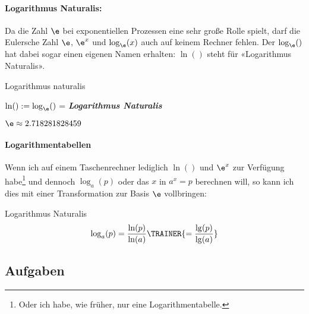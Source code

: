 \paragraph{Logarithmus Naturalis:} Da die
Zahl $\e$ bei exponentiellen Prozessen eine sehr große Rolle spielt,
darf die Eulersche Zahl $\e$, $\e^x$ und $\log_{\e}(x)$ auch auf keinem Rechner fehlen. Der $\log_{\e}()$ hat dabei sogar einen eigenen Namen erhalten:
$\ln()$ steht für «Logarithmus Naturalis».

\begin{definition}{Logarithmus naturalis}{}
  
  $\ln() := \log_{\e}()$ = \textit{\textbf{Logarithmus Naturalis}}

  $\e\approx 2.718281828459$
\end{definition}

\paragraph{Logarithmentabellen}
Wenn ich auf einem Taschenrechner lediglich $\ln()$ und $\e^x$ zur
Verfügung habe\footnote{Oder ich habe, wie früher, nur eine
Logarithmentabelle.} und dennoch $\log_a(p)$ oder das $x$ in $a^x=p$ berechnen will, so kann ich dies mit einer Transformation zur Basis $\e$ vollbringen:

\begin{gesetz}{Logarithmus Naturalis}{}
  $$\log_a(p) = \frac{\ln(p)}{\ln(a)} \TRAINER{= \frac{\lg(p)}{\lg(a)}}$$
\end{gesetz}


\newpage


\subsection*{Aufgaben}

